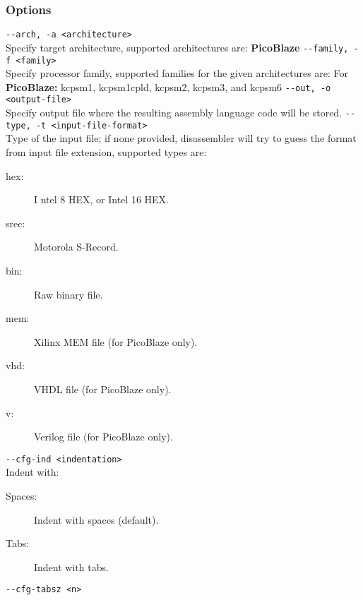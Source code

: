             \subsubsection{Options}
            {
                \usecodefont
                \verb'--arch, -a <architecture>'\\
            }
            Specify target architecture, supported architectures are: \textbf{PicoBlaze}
            {
                \usecodefont
                \verb'--family, -f <family>'\\
            }
                Specify processor family, supported families for the given architectures are:  For \textbf{PicoBlaze:} kcpsm1, kcpsm1cpld, kcpsm2, kcpsm3, and kcpsm6
            {
                \usecodefont
                \verb'--out, -o <output-file>'\\
            }
                Specify output file where the resulting assembly language code will be stored.
            {
                \usecodefont
                \verb'--type, -t <input-file-format>'\\
            }
                 Type of the input file; if none provided, disassembler will try to guess the format from input file extension, supported types are:
                 \begin{description}
                  \item [hex:]I ntel 8 HEX, or Intel 16 HEX.
                  \item [srec:] Motorola S-Record.
                  \item [bin:] Raw binary file.
                  \item [mem:] Xilinx MEM file (for PicoBlaze only).
                  \item [vhd:] VHDL file (for PicoBlaze only).
                  \item [v:] Verilog file (for PicoBlaze only).
                 \end{description}
            {
                \usecodefont
                \verb'--cfg-ind <indentation>'\\
            }
                Indent with:
                \begin{description}
                  \item [Spaces:] Indent with spaces (default).
                  \item [Tabs:] Indent with tabs.
                \end{description}
            {
                \usecodefont
                \verb'--cfg-tabsz <n>'\\
            }
